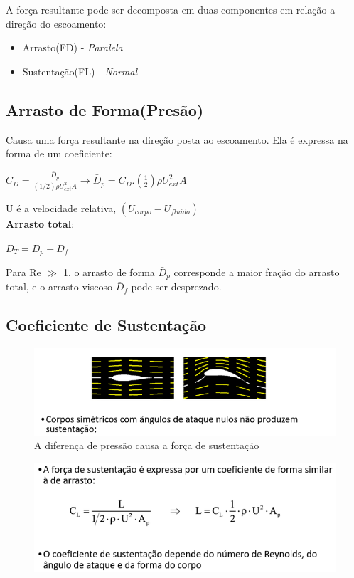 \documentclass[a4paper, 12pt]{article}
\begin{document}
	A força resultante pode ser decomposta em duas componentes em relação a direção do escoamento:
	\begin{itemize}
		\item Arrasto(FD) - \textit{Paralela}
		\item Sustentação(FL) - \textit{Normal}
	\end{itemize}

\subsection{Arrasto de Forma(Presão)}
	Causa uma força resultante na direção posta ao escoamento. Ela é expressa na forma de um coeficiente:
		\begin{center}
			\Large
			$
			C_D = \frac{\bar{D}_p}{(1/2) \rho U^2_{ext} A} \longrightarrow \bar{D}_p = C_D.(\frac{1}{2}) \rho U^2_{ext}A
			$
		\end{center}
	U é a velocidade relativa, $(U_{corpo}-U_{fluido})$\\
\textbf{Arrasto total}:
	\begin{center}
		\Large
		$
		\bar{D}_T = \bar{D}_p + \bar{D}_f
		$
	\end{center}
	Para Re $\gg$ 1, o arrasto de forma $\bar{D}_p$ corresponde a maior fração do arrasto total, e o arrasto viscoso $\bar{D}_f$ pode ser desprezado.

\newpage
\subsection{Coeficiente de Sustentação}
	\begin{figure}[h]
		\centering
		\includegraphics[width=0.8\linewidth]{imagens/sep2}
		\caption{A diferença de pressão causa a força de sustentação}
		\label{fig:sep2}
	\end{figure}
	\newpage
	\begin{figure}[h]
		\centering
		\includegraphics[width=0.7\linewidth]{imagens/sep3}
		\caption{}
		\label{fig:sep3}
	\end{figure}
	
\end{document}
